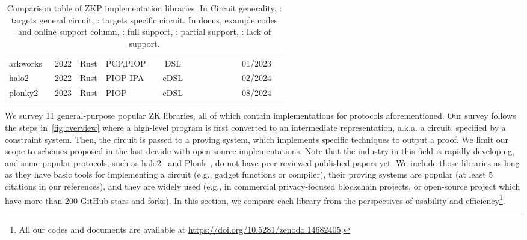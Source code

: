 \documentclass[letterpaper,twocolumn,10pt]{article}
\newcommand{\cmark}{\ding{51}}%
\newcommand{\xmark}{\ding{55}}%
\theoremstyle{definition}
\newcommand{\zk}{\text{zk-SNARK}\xspace}
\newcommand{\new}[1]{{#1}\xspace}
\newcommand{\news}[1]{{#1}\xspace}
\begin{document}
\begin{table*}[ht]
{\begin{threeparttable}
\begin{tabular}{l l l l  c c c l c c c c c c}
				arkworks~\cite{arkworks} & 2022 & Rust & PCP,PIOP & \cmark & DSL & \CIRCLE & \Circle & \CIRCLE & \LEFTcircle &\xmark & \xmark & 01/2023\\
				
				halo2~\cite{halo2} & 2022 & Rust & PIOP-IPA & \cmark & eDSL & \CIRCLE & \CIRCLE & \CIRCLE & \CIRCLE &\xmark & \cmark & 02/2024\\
				
				plonky2~\cite{plonky2} & 2023 & Rust & PIOP & \cmark & eDSL & \CIRCLE & \CIRCLE & \CIRCLE & \CIRCLE &\xmark & \cmark & 08/2024\\
				\bottomrule
			\end{tabular}
	\end{threeparttable}}
	\caption{Comparison table of ZKP implementation libraries. In Circuit generality, \cmark: targets general circuit, \xmark: targets specific circuit. 
		In docus, example codes and online support column, \CIRCLE: full support, \LEFTcircle: partial support, \Circle: lack of support.  }
	\label{tab:info}
\end{table*}
We survey 11 general-purpose popular ZK libraries, all of which contain implementations for \zk protocols aforementioned. Our survey follows the steps in~\autoref{fig:overview} where a high-level program is first converted to an intermediate representation, a.k.a. a circuit, specified by a constraint system. Then, the circuit is passed to a proving system, which implements specific \zk techniques to output a proof. We limit our scope to \zk schemes proposed in the last decade with open-source implementations. Note that the industry in this field is rapidly developing, and some popular protocols, such as halo2~\cite{halo2book} and Plonk~\cite{gabizon2019plonk}, do not have peer-reviewed published papers yet. 
\news{We include those libraries as long as they have basic tools for implementing a circuit (e.g., gadget functions or compiler), their proving systems are popular (at least 5 citations in our references), and they are widely used (e.g., in commercial privacy-focused blockchain projects, or open-source project which have more than 200 GitHub stars and forks).}
In this section, we compare each library from the perspectives of usability and efficiency\footnote{\new{All our codes and documents are available at \url{https://doi.org/10.5281/zenodo.14682405}.}}. 
\end{document}

